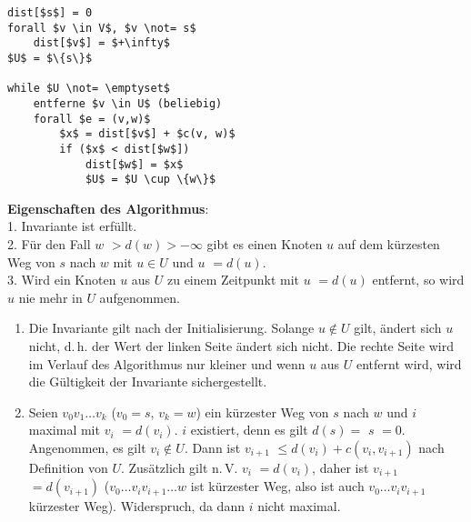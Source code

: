 \begin{lstlisting}
dist[$s$] = 0
forall $v \in V$, $v \not= s$
    dist[$v$] = $+\infty$
$U$ = $\{s\}$

while $U \not= \emptyset$
    entferne $v \in U$ (beliebig)
    forall $e = (v,w)$
        $x$ = dist[$v$] + $c(v, w)$
        if ($x$ < dist[$w$])
            dist[$w$] = $x$
            $U$ = $U \cup \{w\}$
\end{lstlisting}

\linie

\textbf{Eigenschaften des Algorithmus}: \\
1. Invariante ist erfüllt. \\
2. Für den Fall \code{dist[}$w$\code{]} $> d(w) > -\infty$ gibt es einen
Knoten $u$ auf dem kürzesten Weg von $s$ nach $w$ mit
$u \in U$ und \code{dist[}$u$\code{]} $= d(u)$. \\
3. Wird ein Knoten $u$ aus $U$ zu einem Zeitpunkt mit
\code{dist[}$u$\code{]} $= d(u)$ entfernt, so wird $u$ nie mehr in
$U$ aufgenommen.

\begin{Beweis}
    \begin{enumerate}
        \item
        Die Invariante gilt nach der Initialisierung.
        Solange $u \notin U$ gilt, ändert sich \code{dist[}$u$\code{]}
        nicht, d.\,h. der Wert der linken Seite ändert sich nicht.
        Die rechte Seite wird im Verlauf des Algorithmus nur kleiner
        und wenn $u$ aus $U$ entfernt wird, wird die Gültigkeit der
        Invariante sichergestellt.

        \item
        Seien $v_0 v_1 \dotsc v_k$ ($v_0 = s$, $v_k = w$) ein kürzester Weg
        von $s$ nach $w$ und $i$ maximal mit
        \code{dist[}$v_i$\code{]} $= d(v_i)$.
        $i$ existiert, denn es gilt $d(s) =$ \code{dist[}$s$\code{]} $= 0$.
        Angenommen, es gilt $v_i \notin U$.
        Dann ist \code{dist[}$v_{i+1}$\code{]} $\le d(v_i) + c(v_i, v_{i+1})$
        nach Definition von $U$.
        Zusätzlich gilt n.\,V. \code{dist[}$v_i$\code{]} $= d(v_i)$, daher
        ist \code{dist[}$v_{i+1}$\code{]} $= d(v_{i+1})$
        ($v_0 \dotsc v_i v_{i+1} \dotsc w$ ist kürzester Weg, also ist auch
        $v_0 \dotsc v_i v_{i+1}$ kürzester Weg).
        Widerspruch, da dann $i$ nicht maximal.
    \end{enumerate}
\end{Beweis}

\linie
\pagebreak


